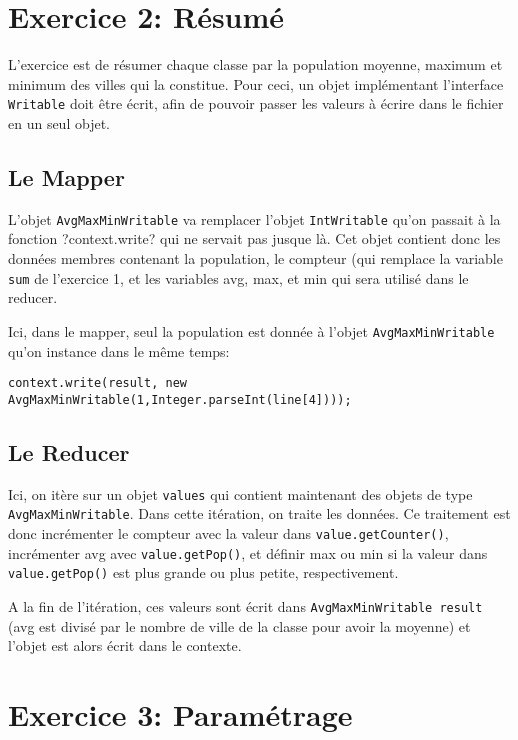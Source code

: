 \documentclass[a4paper]{article}
\begin{document}
\section{Exercice 2: Résumé}

L'exercice est de résumer chaque classe par la population moyenne, maximum et minimum des villes qui la constitue. Pour ceci, un objet implémentant l'interface \verb?Writable? doit être écrit, afin de pouvoir passer les valeurs à écrire dans le fichier en un seul objet.


\subsection{Le Mapper}

L'objet \verb?AvgMaxMinWritable? va remplacer l'objet \verb?IntWritable? qu'on passait à la fonction \ver?context.write? qui ne servait pas jusque là. Cet objet contient donc les données membres contenant la population, le compteur (qui remplace la variable \verb?sum? de l'exercice 1, et les variables avg, max, et min qui sera utilisé dans le reducer.

Ici, dans le mapper, seul la population est donnée à l'objet \verb?AvgMaxMinWritable? qu'on instance dans le même temps:
\begin{lstlisting}
context.write(result, new AvgMaxMinWritable(1,Integer.parseInt(line[4])));
\end{lstlisting}

\subsection{Le Reducer}

Ici, on itère sur un objet \verb?values? qui contient maintenant des objets de type \verb?AvgMaxMinWritable?. Dans cette itération, on traite les données. Ce traitement est donc incrémenter le compteur avec la valeur dans \verb?value.getCounter()?, incrémenter avg avec \verb?value.getPop()?, et définir max ou min si la valeur dans \verb?value.getPop()? est plus grande ou plus petite, respectivement.

A la fin de l'itération, ces valeurs sont écrit dans \verb?AvgMaxMinWritable result? (avg est divisé par le nombre de ville de la classe pour avoir la moyenne) et l'objet est alors écrit dans le contexte.

\section{Exercice 3: Paramétrage}
\end{document}
